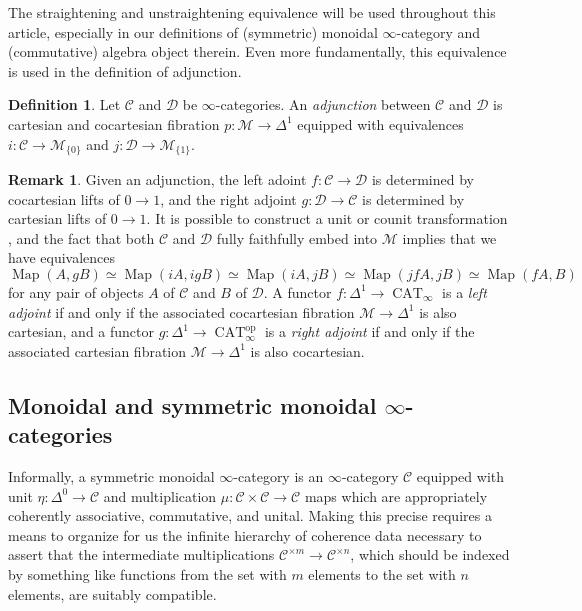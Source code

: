 \documentclass[12pt]{article}
\theoremstyle{definition}
\newtheorem{definition}{Definition}[subsection]
\newtheorem{remark}{Remark}[subsection]
\newcommand{\C}{\mathcal{C}}
\newcommand{\D}{\mathcal{D}}
\newcommand{\M}{\mathcal{M}}
\renewcommand{\i}{\infty}
\newcommand{\op}{\mathrm{op}}
\DeclareMathOperator{\CAT}{CAT}
\DeclareMathOperator{\Map}{Map}
\begin{document}
The straightening and unstraightening equivalence will be used throughout this article, especially in our definitions of (symmetric) monoidal $\infty$-category and (commutative) algebra object therein.
Even more fundamentally, this equivalence is used in the definition of adjunction.

\begin{definition}
Let $\C$ and $\D$ be $\i$-categories.
An {\em adjunction} between $\C$ and $\D$ is cartesian and cocartesian fibration $p:\M\to\Delta^1$ equipped with equivalences $i:\C\to\M_{\{0\}}$ and $j:\D\to\M_{\{1\}}$.
\end{definition}
\begin{remark}
Given an adjunction, the left adoint $f:\C\to\D$ is determined by cocartesian lifts of $0\to 1$, and the right adjoint $g:\D\to\C$ is determined by cartesian lifts of $0\to 1$.
It is possible to construct a unit or counit transformation \cite[Proposition 5.2.2.8]{HTT}, and the fact that both $\C$ and $\D$ fully faithfully embed into $\M$ implies that we have equivalences
\[
\Map(A,gB)\simeq\Map(iA,igB)\simeq\Map(iA,jB)\simeq\Map(jfA,jB)\simeq\Map(fA,B)
\]
for any pair of objects $A$ of $\C$ and $B$ of $\D$.
A functor $f:\Delta^1\to\CAT_\i$ is a {\em left adjoint} if and only if the associated cocartesian fibration $\M\to\Delta^1$ is also cartesian, and a functor $g:\Delta^{1}\to\CAT_\i^{\op}$ is a {\em right adjoint} if and only if the associated cartesian fibration $\M\to\Delta^1$ is also cocartesian.
\end{remark}
\subsection{Monoidal and symmetric monoidal $\infty$-categories}

Informally, a symmetric monoidal $\infty$-category is an $\infty$-category $\C$ equipped with unit $\eta:\Delta^0\to\C$ and multiplication $\mu:\C\times\C\to\C$ maps which are appropriately coherently associative, commutative, and unital.
Making this precise requires a means to organize for us the infinite hierarchy of coherence data necessary to assert that the intermediate multiplications $\C^{\times m}\to\C^{\times n}$, which should be indexed by something like functions from the set with $m$ elements to the set with $n$ elements, are suitably compatible.
\end{document}
